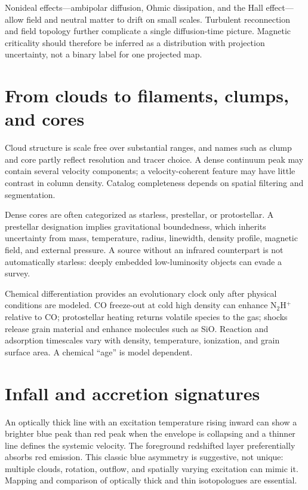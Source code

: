 Nonideal effects---ambipolar diffusion, Ohmic dissipation, and the Hall effect---allow
field and neutral matter to drift on small scales.  Turbulent reconnection and field
topology further complicate a single diffusion-time picture.  Magnetic criticality
should therefore be inferred as a distribution with projection uncertainty, not a
binary label for one projected map.

\section{From clouds to filaments, clumps, and cores}

Cloud structure is scale free over substantial ranges, and names such as clump and
core partly reflect resolution and tracer choice.  A dense continuum peak may contain
several velocity components; a velocity-coherent feature may have little contrast in
column density.  Catalog completeness depends on spatial filtering and segmentation.

Dense cores are often categorized as starless, prestellar, or protostellar.  A
prestellar designation implies gravitational boundedness, which inherits uncertainty
from mass, temperature, radius, linewidth, density profile, magnetic field, and
external pressure.  A source without an infrared counterpart is not automatically
starless: deeply embedded low-luminosity objects can evade a survey.

Chemical differentiation provides an evolutionary clock only after physical
conditions are modeled.  CO freeze-out at cold high density can enhance N$_2$H$^+$
relative to CO; protostellar heating returns volatile species to the gas; shocks
release grain material and enhance molecules such as SiO.  Reaction and adsorption
timescales vary with density, temperature, ionization, and grain surface area.  A
chemical ``age'' is model dependent.

\section{Infall and accretion signatures}

An optically thick line with an excitation temperature rising inward can show a
brighter blue peak than red peak when the envelope is collapsing and a thinner line
defines the systemic velocity.  The foreground redshifted layer preferentially
absorbs red emission.  This classic blue asymmetry is suggestive, not unique:
multiple clouds, rotation, outflow, and spatially varying excitation can mimic it.
Mapping and comparison of optically thick and thin isotopologues are essential.

